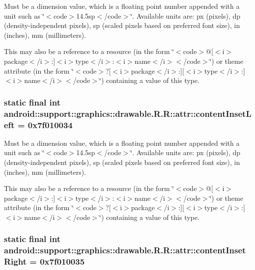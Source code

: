 Must be a dimension value, which is a floating point number appended with a unit such as \char`\"{}$<$code$>$14.5sp$<$/code$>$\char`\"{}. Available units are: px (pixels), dp (density-independent pixels), sp (scaled pixels based on preferred font size), in (inches), mm (millimeters). 

This may also be a reference to a resource (in the form \char`\"{}$<$code$>$@\mbox{[}$<$i$>$package$<$/i$>$:\mbox{]}$<$i$>$type$<$/i$>$:$<$i$>$name$<$/i$>$$<$/code$>$\char`\"{}) or theme attribute (in the form \char`\"{}$<$code$>$?\mbox{[}$<$i$>$package$<$/i$>$:\mbox{]}\mbox{[}$<$i$>$type$<$/i$>$:\mbox{]}$<$i$>$name$<$/i$>$$<$/code$>$\char`\"{}) containing a value of this type. \hypertarget{classandroid_1_1support_1_1graphics_1_1drawable_1_1_r_1_1attr_b4173a048c6688f48e47ec7f1fbad489}{
\subsubsection[{contentInsetLeft}]{\setlength{\rightskip}{0pt plus 5cm}static final int android::support::graphics::drawable.R.R::attr::contentInsetLeft = 0x7f010034}}
\label{classandroid_1_1support_1_1graphics_1_1drawable_1_1_r_1_1attr_b4173a048c6688f48e47ec7f1fbad489}


Must be a dimension value, which is a floating point number appended with a unit such as \char`\"{}$<$code$>$14.5sp$<$/code$>$\char`\"{}. Available units are: px (pixels), dp (density-independent pixels), sp (scaled pixels based on preferred font size), in (inches), mm (millimeters). 

This may also be a reference to a resource (in the form \char`\"{}$<$code$>$@\mbox{[}$<$i$>$package$<$/i$>$:\mbox{]}$<$i$>$type$<$/i$>$:$<$i$>$name$<$/i$>$$<$/code$>$\char`\"{}) or theme attribute (in the form \char`\"{}$<$code$>$?\mbox{[}$<$i$>$package$<$/i$>$:\mbox{]}\mbox{[}$<$i$>$type$<$/i$>$:\mbox{]}$<$i$>$name$<$/i$>$$<$/code$>$\char`\"{}) containing a value of this type. \hypertarget{classandroid_1_1support_1_1graphics_1_1drawable_1_1_r_1_1attr_e20ffa2a480f0dcb0c9799ab9595cfa1}{
\subsubsection[{contentInsetRight}]{\setlength{\rightskip}{0pt plus 5cm}static final int android::support::graphics::drawable.R.R::attr::contentInsetRight = 0x7f010035}}
\label{classandroid_1_1support_1_1graphics_1_1drawable_1_1_r_1_1attr_e20ffa2a480f0dcb0c9799ab9595cfa1}


